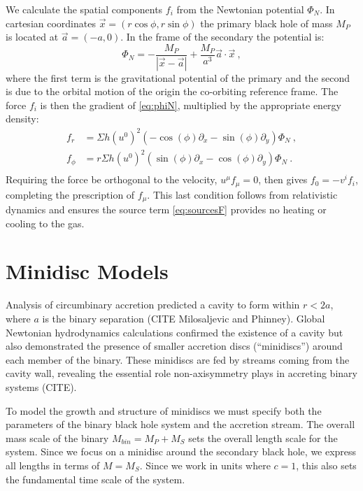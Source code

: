 \documentclass{emulateapj}
\newcommand{\Sig}{\Sigma}
\begin{document}
We calculate the spatial components $f_i$ from the Newtonian potential $\Phi_N$.  In cartesian coordinates $\vec{x}=(r \cos \phi, r \sin \phi)$ the primary black hole of mass $M_P$ is located at $\vec a = (-a, 0)$.  In the frame of the secondary the potential is:
\begin{equation}
	\Phi_N = -\frac{M_P}{|\vec{x} -  \vec{a} |} + \frac{M_P}{a^3}  \vec{a} \cdot \vec{x} \ , \label{eq:phiN}
\end{equation}
where the first term is the gravitational potential of the primary and the second is due to the orbital motion of the origin the co-orbiting reference frame.  The force $f_i$ is then the gradient of \eqref{eq:phiN}, multiplied by the appropriate energy density:
\begin{align}
	f_r &= \Sig h (u^0)^2 \left( -\cos(\phi) \partial_x  - \sin(\phi)\partial_y\right) \Phi_N \ ,\nonumber \\
	f_\phi &= r\Sig h (u^0)^2 \left( \sin(\phi) \partial_x  -\cos(\phi)\partial_y\right) \Phi_N \ .\nonumber \\
\end{align}
Requiring the force be orthogonal to the velocity, $u^\mu f_\mu = 0$, then gives $f_0 = -v^i f_i$, completing the prescription of $f_\mu$. This last condition follows from relativistic dynamics and ensures the source term \eqref{eq:sourcesF} provides no heating or cooling to the gas.


\section{Minidisc Models}
\label{sec:models}

Analysis of circumbinary accretion predicted a cavity to form within $r<2a$, where $a$ is the binary separation (CITE Milosaljevic and Phinney). Global Newtonian hydrodynamics calculations confirmed the existence of a cavity but also demonstrated the presence of smaller accretion discs (``minidiscs'') around each member of the binary.  These minidiscs are fed by streams coming from the cavity wall, revealing the essential role non-axisymmetry plays in accreting binary systems (CITE).

To model the growth and structure of minidiscs we must specify both the parameters of the binary black hole system and the accretion stream.  The overall mass scale of the binary $M_{bin} = M_P+M_S$ sets the overall length scale for the system.  Since we focus on a minidisc around the secondary black hole, we express all lengths in terms of $M = M_S$.  Since we work in units where $c=1$, this also sets the fundamental time scale of the system.  
\end{document}
